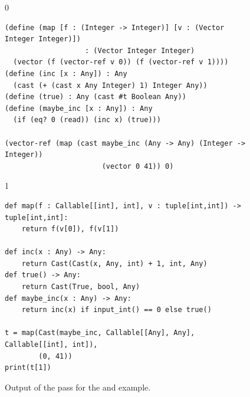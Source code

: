\documentclass[7x10]{TimesAPriori_MIT}%
\def\racketEd{0}
\def\pythonEd{1}
\def\edition{1}
\newcommand{\pythonColor}[0]{}
\numberwithin{theorem}{chapter}
\numberwithin{definition}{chapter}
\numberwithin{equation}{chapter}
\begin{document}
\begin{figure}[btp]
  \begin{tcolorbox}[colback=white]
{\if\edition\racketEd        
\begin{lstlisting}
(define (map [f : (Integer -> Integer)] [v : (Vector Integer Integer)])
                   : (Vector Integer Integer)
  (vector (f (vector-ref v 0)) (f (vector-ref v 1))))
(define (inc [x : Any]) : Any
  (cast (+ (cast x Any Integer) 1) Integer Any))
(define (true) : Any (cast #t Boolean Any))
(define (maybe_inc [x : Any]) : Any
  (if (eq? 0 (read)) (inc x) (true)))

(vector-ref (map (cast maybe_inc (Any -> Any) (Integer -> Integer))
                       (vector 0 41)) 0)
\end{lstlisting}
\fi}
{\if\edition\pythonEd\pythonColor        
\begin{lstlisting}[basicstyle=\ttfamily\footnotesize]
def map(f : Callable[[int], int], v : tuple[int,int]) -> tuple[int,int]:
    return f(v[0]), f(v[1])

def inc(x : Any) -> Any:
    return Cast(Cast(x, Any, int) + 1, int, Any)
def true() -> Any:
    return Cast(True, bool, Any)
def maybe_inc(x : Any) -> Any:
    return inc(x) if input_int() == 0 else true()

t = map(Cast(maybe_inc, Callable[[Any], Any], Callable[[int], int]),
        (0, 41))
print(t[1])
\end{lstlisting}
\fi}
\end{tcolorbox}

\caption{Output of the  pass for the 
  and  example.}
\label{fig:map-cast}
\end{figure}
\end{document}
